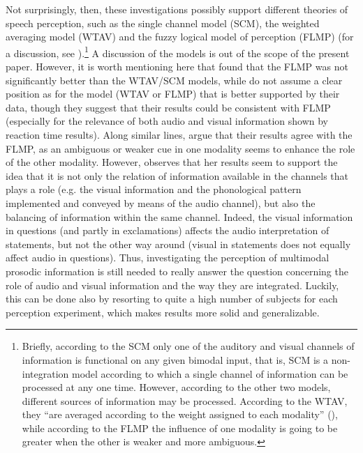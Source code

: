 \documentclass[output=paper]{langsci/langscibook}
\begin{document}
Not surprisingly, then, these investigations possibly support different theories of speech perception, such as the single channel model (SCM), the weighted averaging model (WTAV) and the fuzzy logical model of perception (FLMP) (for a discussion, see \citealt{Massaro1989,MassaroCohen1993,Srinivasan2003}).\footnote{Briefly, according to the SCM only one of the auditory and visual channels of information is functional on any given bimodal input, that is, SCM is a non-integration model according to which a single channel of information can be processed at any one time. However, according to the other two models, different sources of information may be processed. According to the WTAV, they “are averaged according to the weight assigned to each modality” (\citealt[10]{Srinivasan2003}), while according to the FLMP the influence of one modality is going to be greater when the other is weaker and more ambiguous.} A discussion of the models is out of the scope of the present paper. However, it is worth mentioning here that \citet[20]{Srinivasan2003} found that the FLMP was not significantly better than the WTAV\slash SCM models, while \citet{BorrasComes2011} do not assume a clear position as for the model (WTAV or FLMP) that is better supported by their data, though they suggest that their results could be consistent with FLMP (especially for the relevance of both audio and visual information shown by reaction time results). Along similar lines,  \citet{CrespoSendra2013} argue that their results agree with the FLMP, as an ambiguous or weaker cue in one modality seems to enhance the role of the other modality. However, \citet{GiliFivela2015informazionimultimodali} observes that her results seem to support the idea that it is not only the relation of information available in the channels that plays a role (e.g. the visual information and the phonological pattern implemented and conveyed by means of the audio channel), but also the balancing of information within the same channel. Indeed,  the visual information in questions (and partly in exclamations) affects the audio interpretation of statements, but not the other way around (visual in statements does not equally affect audio in questions). Thus, investigating the perception of multimodal prosodic information is still needed to really answer the question concerning the role of audio and visual information and the way they are integrated. Luckily, this can be done also by resorting to quite a high number of subjects for each perception experiment, which makes results more solid and generalizable.
\end{document}
